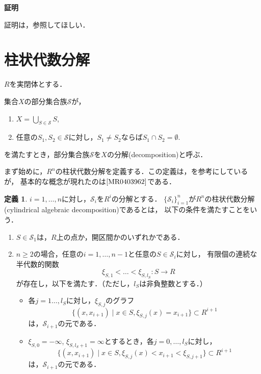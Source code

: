 \documentclass[uplatex, dvipdfmx]{jsarticle}
\makeatletter
\numberwithin{equation}{section}
\renewenvironment{proof}[1][\proofname]{\par
  \pushQED{\qed}%
  \normalfont \topsep6\p@\@plus6\p@\relax
  \trivlist
  \item\relax
  {\bfseries
  #1\@addpunct{.}}\hspace\labelsep\ignorespaces
}{
  \popQED\endtrivlist\@endpefalse
}
\newcommand{\calS}{\mathcal{S}}
\newcommand{\map}[3]{{#1}\colon{#2}\rightarrow{#3}}
\theoremstyle{definition}
\newtheorem{definition}{定義}[section]
\renewcommand{\proofname}{\textbf{証明}}
\makeatother
\begin{document}
\begin{proof}
    証明は，\cite[Theorem 5.12.]{MR2248869}参照してほしい．
\end{proof}


\section{柱状代数分解}

$R$を実閉体とする．

集合$X$の部分集合族$\calS$が，
\begin{enumerate}
     \item $X = \bigcup_{S \in \calS} S$,
     \item 任意の$S_1, S_2 \in \calS$に対し，$S_1 \neq S_2$ならば$S_1 \cap S_2 = \emptyset$.
\end{enumerate}
を満たすとき，部分集合族$\calS$を$X$の分解(decomposition)と呼ぶ．

まず始めに，$R^n$の柱状代数分解を定義する．この定義は，\cite{MR0764184}\cite[Definition 5.1]{MR2248869}を参考にしているが，
基本的な概念が現れたのは$\cite{MR0403962}$である．

\begin{definition} \label{definition:cad}
     $i=1, \dots, n$に対し，$\calS_i$を$R^i$の分解とする．
     $\{\calS_i\}_{i=1}^n$が$R^n$の柱状代数分解(cylindrical algebraic decomposition)であるとは，
     以下の条件を満たすことをいう．
     \begin{enumerate}
          \item $S \in \calS_1$は，$R$上の点か，開区間かのいずれかである．
          \item $n\geq 2$の場合，任意の$i=1, \dots, n-1$と任意の$S \in \calS_i$に対し，
          有限個の連続な半代数的関数
          \begin{equation}
               \map{\xi_{S,1}< \dots <\xi_{S,l_S}}{S}{R}
          \end{equation}
          が存在し，以下を満たす．（ただし，$l_S$は非負整数とする．）
          \begin{itemize}
               \item 各$j=1 \dots, l_S$に対し，$\xi_{S,j}$のグラフ
               \begin{equation}
                    \{(x,x_{i+1}) \mid x \in S, \xi_{S,j}(x)=x_{i+1} \} \subset R^{i+1}
               \end{equation}
               は，$\calS_{i+1}$の元である．
               \item $\xi_{S,0}=-\infty$, $\xi_{S,l_S+1}=\infty$とするとき，各$j=0, \dots, l_S$に対し，\label{cad_condition1}
               \begin{equation}
                    \{(x,x_{i+1}) \mid x \in S, \xi_{S,j}(x)<x_{i+1}<\xi_{S,j+1} \} \subset R^{i+1}
               \end{equation}
               は，$\calS_{i+1}$の元である．
          \end{itemize}
     \end{enumerate}
\end{definition}
\end{document}
